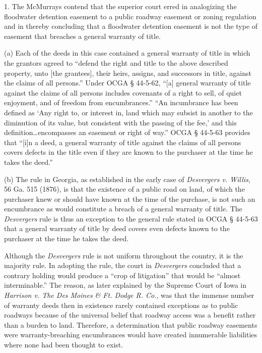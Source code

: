 1. The McMurrays contend that the superior court erred in analogizing the
floodwater detention easement to a public roadway easement or zoning regulation
and in thereby concluding that a floodwater detention easement is not the type
of easement that breaches a general warranty of title. 

(a) Each of the deeds in this case contained a general warranty of title in
which the grantors agreed to ``defend the right and title to the above
described property, unto [the grantees], their heirs, assigns, and successors
in title, against the claims of all persons.'' Under OCGA {\S} 44-5-62, ``[a]
general warranty of title against the claims of all persons includes covenants
of a right to sell, of quiet enjoyment, and of freedom from encumbrances.''
``An incumbrance has been defined as `Any right to, or interest in, land which
may subsist in another to the diminution of its value, but consistent with the
passing of the fee,' and this definition\ldots encompasses an easement or right
of way.'' OCGA {\S} 44-5-63 provides that ``[i]n a deed, a general warranty of
title against the claims of all persons covers defects in the title even if
they are known to the purchaser at the time he takes the deed.'' 

(b) The rule in Georgia, as established in the early case of \textit{Desvergers
v. Willis}, 56 Ga. 515 (1876), is that the existence of a public road on land,
of which the purchaser knew or should have known at the time of the purchase,
is not such an encumbrance as would constitute a breach of a general warranty
of title. The \textit{Desvergers} rule is thus an exception to the general rule
stated in OCGA {\S} 44-5-63 that a general warranty of title by deed covers
even defects known to the purchaser at the time he takes the deed. 

Although the \textit{Desvergers} rule is not uniform throughout the country, it
is the majority rule. In adopting the rule, the court in \textit{Desvergers}
concluded that a contrary holding would produce a ``crop of litigation'' that
would be ``almost interminable.'' The reason, as later explained by the Supreme
Court of Iowa in \textit{Harrison v. The Des Moines \& Ft. Dodge R. Co.}, was
that the immense number of warranty deeds then in existence rarely contained
exceptions as to public roadways because of the universal belief that roadway
access was a benefit rather than a burden to land. Therefore, a determination
that public roadway easements were warranty-breaching encumbrances would have
created innumerable liabilities where none had been thought to exist. 

